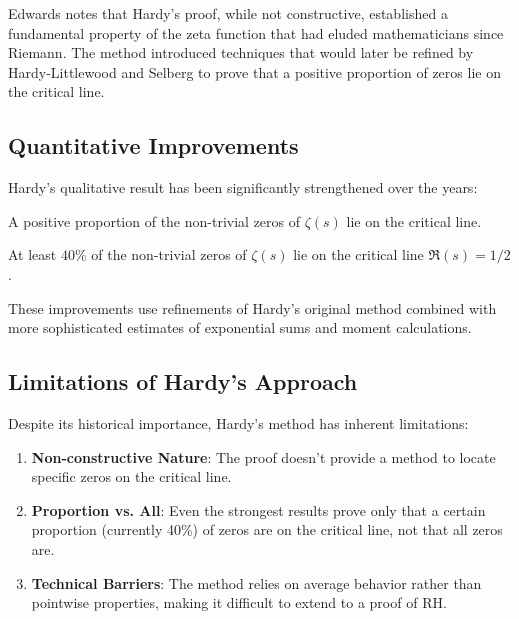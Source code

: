 \begin{remark}
Edwards notes that Hardy's proof, while not constructive, established a fundamental property of the zeta function that had eluded mathematicians since Riemann. The method introduced techniques that would later be refined by Hardy-Littlewood and Selberg to prove that a positive proportion of zeros lie on the critical line.
\end{remark}

\subsection{Quantitative Improvements}

Hardy's qualitative result has been significantly strengthened over the years:

\begin{theorem}
A positive proportion of the non-trivial zeros of $\zeta(s)$ lie on the critical line.
\end{theorem}

\begin{theorem}
At least $40\%$ of the non-trivial zeros of $\zeta(s)$ lie on the critical line $\Re(s) = 1/2$.
\end{theorem}

These improvements use refinements of Hardy's original method combined with more sophisticated estimates of exponential sums and moment calculations.

\subsection{Limitations of Hardy's Approach}

Despite its historical importance, Hardy's method has inherent limitations:

\begin{enumerate}
\item \textbf{Non-constructive Nature}: The proof doesn't provide a method to locate specific zeros on the critical line.
\item \textbf{Proportion vs. All}: Even the strongest results prove only that a certain proportion (currently 40\%) of zeros are on the critical line, not that all zeros are.
\item \textbf{Technical Barriers}: The method relies on average behavior rather than pointwise properties, making it difficult to extend to a proof of RH.
\end{enumerate}


